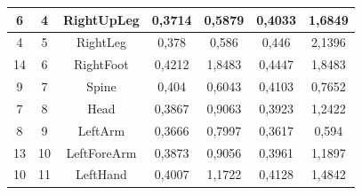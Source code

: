 \begin{table}[H]
{\begin{tabular}{|c|c|c|c|c|c|c|}
6        & 4         & RightUpLeg         & 0,3714                                                       & 0,5879                                                       & 0,4033                                                                  & 1,6849                                                                  \\ \hline
4        & 5         & RightLeg           & 0,378                                                        & 0,586                                                        & 0,446                                                                   & 2,1396                                                                  \\ \hline
14       & 6         & RightFoot          & 0,4212                                                       & 1,8483                                                       & 0,4447                                                                  & 1,8483                                                                  \\ \hline
9        & 7         & Spine              & 0,404                                                        & 0,6043                                                       & 0,4103                                                                  & 0,7652                                                                  \\ \hline
7        & 8         & Head               & 0,3867                                                       & 0,9063                                                       & 0,3923                                                                  & 1,2422                                                                  \\ \hline
8        & 9         & LeftArm            & 0,3666                                                       & 0,7997                                                       & 0,3617                                                                  & 0,594                                                                   \\ \hline
13       & 10        & LeftForeArm        & 0,3873                                                       & 0,9056                                                       & 0,3961                                                                  & 1,1897                                                                  \\ \hline
10       & 11        & LeftHand           & 0,4007                                                       & 1,1722                                                       & 0,4128                                                                  & 1,4842                                                                  \\ \hline

\end{tabular}}
\end{table}
